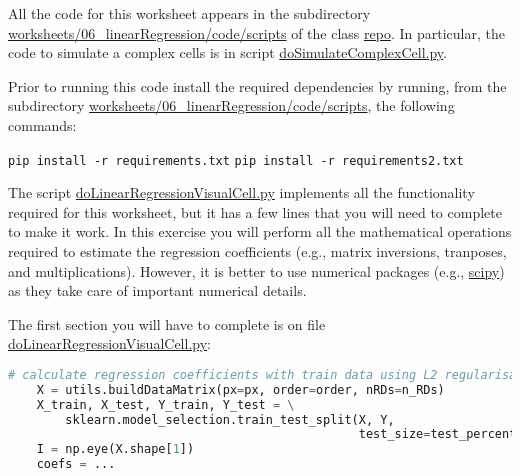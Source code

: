 \documentclass[12pt]{article}
\begin{document}
All the code for this worksheet appears in the subdirectory
\href{https://github.com/joacorapela/neuroinformatics24/blob/master/worksheets/06_linearRegression/code/scripts}{worksheets/06\_linearRegression/code/scripts} of the class
\href{https://github.com/joacorapela/neuroinformatics24}{repo}. In particular,
the code to simulate a complex cells is in script
\href{https://github.com/joacorapela/neuroinformatics24/blob/master/worksheets/06_linearRegression/code/scripts/doSimulateComplexCell.py}{doSimulateComplexCell.py}.

Prior to running this code install the required dependencies by running, from the subdirectory
\href{https://github.com/joacorapela/neuroinformatics24/blob/master/worksheets/06_linearRegression/code/scripts}{worksheets/06\_linearRegression/code/scripts},
the following commands:

\noindent\texttt{pip install -r requirements.txt}\linebreak
\noindent\texttt{pip install -r requirements2.txt}

The script
\href{https://github.com/joacorapela/neuroinformatics24/blob/master/worksheets/06_linearRegression/code/scripts/doLinearRegressionVisualCell.py}{doLinearRegressionVisualCell.py}
implements all the functionality required for this worksheet, but it has a few
lines that you will need to complete to make it work. In this exercise you will
perform all the mathematical operations required to estimate the regression
coefficients (e.g., matrix inversions, tranposes, and multiplications).
However, it is better to use numerical packages (e.g.,
\href{https://scipy.org/}{scipy}) as they take care of important numerical
details.

The first section you will have to complete is on file
\href{https://github.com/joacorapela/neuroinformatics24/blob/master/worksheets/06_linearRegression/code/scripts/https://github.com/joacorapela/neuroinformatics24/blob/master/worksheets/06_linearRegression/code/scripts/doLinearRegressionVisualCell.py}{doLinearRegressionVisualCell.py}:

\begin{lstlisting}[language=python]
    # calculate regression coefficients with train data using L2 regularisation
    X = utils.buildDataMatrix(px=px, order=order, nRDs=n_RDs)
    X_train, X_test, Y_train, Y_test = \
        sklearn.model_selection.train_test_split(X, Y,
                                                 test_size=test_percentage)
    I = np.eye(X.shape[1])
    coefs = ...
\end{lstlisting}
\end{document}
